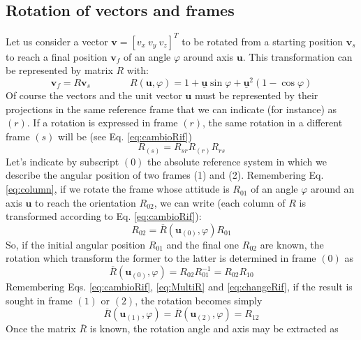 \documentclass[preprint, 12pt]{elsarticle}
\def\vect#1{{\boldsymbol{#1}}}
\begin{document}
\subsection{Rotation of vectors and frames}
\label{app:RotatMatrix2}
Let us consider a vector $\vect{v} = [v_x\ v_y\ v_z]^T$ to be rotated from a starting position $\vect{v}_s$ to reach a final position $\vect{v}_f$ of an angle $\varphi$ around axis $\vect{u}$. This transformation can be represented by matrix $R$ with:
\begin{equation}
    \vect{v}_f = R \vect{v}_s 
    \qquad\qquad 
    R(\vect{u},\varphi) = 1 + \underline{\vect{u}}\sin\varphi + \underline{\vect{u}}^2(1-\cos\varphi)
    \label{eq:rotat_phi_u}
\end{equation}
Of course the vectors and the unit vector $\vect{u}$ must be represented by their projections in the same reference frame that we can indicate (for instance) as $(r)$. If a rotation is expressed in frame $(r)$, the same rotation in a different frame $(s)$ will be (see Eq. \ref{eq:cambioRif})
\begin{equation}
    R_{(s)}= R_{sr} R_{(r)} R_{rs}
    \label{eq:changeRif}
\end{equation}
Let's indicate by subscript $(0)$ the absolute reference system in which we describe the angular position of two frames (1) and (2).
Remembering Eq. \ref{eq:column}, if we rotate the frame whose attitude is $R_{01}$ of an angle $\varphi$ around an axis $\vect{u}$ to reach the orientation $R_{02}$, we can write (each column of $R$ is transformed according to Eq. \ref{eq:cambioRif}):
\begin{equation}
    R_{02}=\overline{R}(\vect{u}_{(0)},\varphi) R_{01}
    \label{eq:rotR01_02}
\end{equation}
So, if the initial angular position $R_{01}$ and the final one $R_{02}$ are known, the rotation which transform the former to the latter is determined in frame $(0)$ as
\begin{equation}
    \overline{R}(\vect{u}_{(0)},\varphi) = R_{02} R_{01}^{-1} = R_{02} R_{10}
    \label{eq:RotFrame0}
\end{equation}
Remembering Eqs. \ref{eq:cambioRif}, \ref{eq:MultiR} and \ref{eq:changeRif}, if the result is sought in frame $(1)$ or $(2)$, the rotation becomes simply
\begin{equation}
   \overline{R}(\vect{u}_{(1)}, \varphi) = \overline{R}(\vect{u}_{(2)},\varphi) = R_{12}
    \label{eq:RRR12}
\end{equation}
Once the matrix $\overline{R}$ is known, the rotation angle and axis may be extracted as
\end{document}
